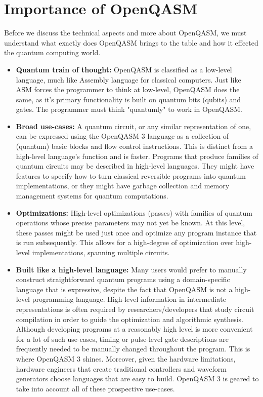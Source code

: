 \documentclass[conference]{IEEEtran}
\begin{document}
\section{\textbf{Importance of OpenQASM}}
Before we discuss the technical aspects and more about OpenQASM, we must understand what exactly does OpenQASM brings to the table and how it effected the quantum computing world.
\begin{itemize}
\item \textbf{Quantum train of thought:} OpenQASM is classified as a low-level language, much like Assembly language for classical computers. Just like ASM forces the programmer to think at low-level, OpenQASM does the same, as it's primary functionality is built on quantum bits (qubits) and gates. The programmer must think "quantumly" to work in OpenQASM. \cite{b2}
\item \textbf{Broad use-cases: }A quantum circuit, or any similar representation of one, can be expressed using the OpenQASM 3 language as a collection of (quantum) basic blocks and flow control instructions. This is distinct from a high-level language's function and is faster. Programs that produce families of quantum circuits may be described in high-level languages. They might have features to specify how to turn classical reversible programs into quantum implementations, or they might have garbage collection and memory management systems for quantum computations. 
\item \textbf{Optimizations:} High-level optimizations (passes) with families of quantum operations whose precise parameters may not yet be known. At this level, these passes might be used just once and optimize any program instance that is run subsequently. This allows for a high-degree of optimization over high-level implementations, spanning multiple circuits. \cite{b3}
\item \textbf{Built like a high-level language:} Many users would prefer to manually construct straightforward quantum programs using a domain-specific language that is expressive, despite the fact that OpenQASM is not a high-level programming language. High-level information in intermediate representations is often required by researchers/developers that study circuit compilation in order to guide the optimization and algorithmic synthesis. 
Although developing programs at a reasonably high level is more convenient for a lot of such use-cases, timing or pulse-level gate descriptions are frequently needed to be manually changed throughout the program. This is where OpenQASM 3 shines. \cite{b3} Moreover, given the hardware limitations, hardware engineers that create traditional controllers and waveform generators choose languages that are easy to build. OpenQASM 3 is geared to take into account all of these prospective use-cases.

\end{itemize}
\end{document}
